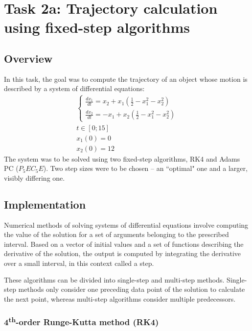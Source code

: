 \documentclass{article}
\begin{document}
	\newpage
	\section{Task 2a: Trajectory calculation using fixed-step algorithms}
	
	\subsection{Overview}
	
	In this task, the goal was to compute the trajectory of an object whose
	motion is described by a system of differential equations:
	\begin{gather*}
		\begin{cases}
			\frac{dx_1}{dt} = x_2 + x_1(\frac{1}{2} - x_1^2 - x_2^2)\\
			\frac{dx_2}{dt} = -x_1 + x_2(\frac{1}{2} - x_1^2 - x_2^2)
		\end{cases}\\
		t \in [0; 15]\\
		x_1(0) = 0\\
		x_2(0) = 12
	\end{gather*}
	The system was to be solved using two fixed-step algorithms, RK4 and
	Adams PC ($P_5EC_5E$). Two step sizes were to be chosen -- an ``optimal"
	one and a larger, visibly differing one.
	
	\subsection{Implementation}
	
	Numerical methods of solving systems of differential equations involve
	computing the value of the solution for a set of arguments belonging to
	the prescribed interval. Based on a vector of initial values and a set
	of functions describing the derivative of the solution, the output is
	computed by integrating the derivative over a small interval, in this
	context called a step.
	
	These algorithms can be divided into single-step and multi-step methods.
	Single-step methods only consider one preceding data point of the
	solution to calculate the next point, whereas multi-step algorithms
	consider multiple predecessors.
	
	\subsubsection{4\textsuperscript{th}-order Runge-Kutta method (RK4)}
	
\end{document}

